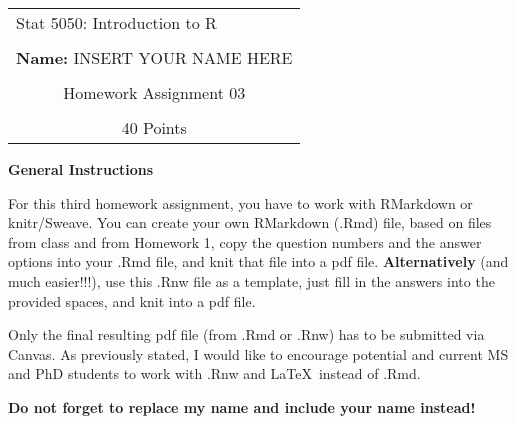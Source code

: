 \documentclass[12pt,letterpaper,final]{article}\usepackage[]{graphicx}\usepackage[]{xcolor}
\begin{document}
\begin{table}\centering
\begin{tabular*}{6.15in}{@{\extracolsep{\fill}}|llr|} \hline
Stat 5050: Introduction to R & \hspace*{0.5 in}\\
 & & \\
\multicolumn{3}{|c|}{
{\bf Name:} INSERT YOUR NAME HERE} \\
 & & \\
\multicolumn{3}{|c|}{
Homework Assignment 03 } \\
 & & \\
\multicolumn{3}{|c|}{
40 Points} \\
\hline
\end{tabular*}
\end{table}


{\bf General Instructions}

For this third homework assignment, you have to work with RMarkdown or knitr/Sweave.
You can create your own RMarkdown (.Rmd) file,
based on files from class and from Homework 1, copy the
question numbers and the answer options into your .Rmd file, 
and knit that file into a pdf file. 
{\bf Alternatively} (and much easier!!!), use this .Rnw file as a 
template, just fill in the answers into the provided spaces,
and knit into a pdf file.

Only the final resulting pdf file (from .Rmd or .Rnw) has to be submitted via Canvas.
As previously stated, I would like to encourage potential and current MS and PhD students
to work with .Rnw and \LaTeX\ instead of .Rmd.

{\bf Do not forget to replace my name and include your name instead!}
\end{document}
